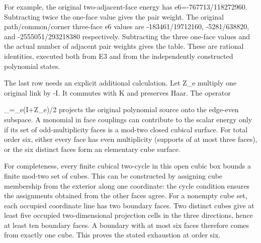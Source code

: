 \documentclass[11pt,a4paper]{article}
\newcounter{none}
\renewcommand{\[}{\begingroup\small\originaldisplaystart}
\renewcommand{\]}{\originaldisplayend\endgroup}
\begin{document}
For example, the original two-adjacent-face energy has
{\ttfamily e\allowbreak{}6\allowbreak{}=\allowbreak{}-\allowbreak{}7\allowbreak{}6\allowbreak{}7\allowbreak{}7\allowbreak{}1\allowbreak{}3\allowbreak{}/\allowbreak{}1\allowbreak{}1\allowbreak{}8\allowbreak{}2\allowbreak{}7\allowbreak{}2\allowbreak{}9\allowbreak{}6\allowbreak{}0\allowbreak{}}.
Subtracting twice the one-face value gives the pair weight. The original
path/common/corner three-face e6 values are
{\ttfamily -\allowbreak{}1\allowbreak{}8\allowbreak{}3\allowbreak{}4\allowbreak{}6\allowbreak{}1\allowbreak{}/\allowbreak{}1\allowbreak{}9\allowbreak{}7\allowbreak{}1\allowbreak{}2\allowbreak{}1\allowbreak{}6\allowbreak{}0\allowbreak{}},
{\ttfamily -\allowbreak{}5\allowbreak{}2\allowbreak{}8\allowbreak{}1\allowbreak{}/\allowbreak{}6\allowbreak{}3\allowbreak{}8\allowbreak{}8\allowbreak{}2\allowbreak{}0\allowbreak{}},
and
{\ttfamily -\allowbreak{}2\allowbreak{}5\allowbreak{}5\allowbreak{}5\allowbreak{}0\allowbreak{}5\allowbreak{}1\allowbreak{}/\allowbreak{}2\allowbreak{}9\allowbreak{}3\allowbreak{}2\allowbreak{}1\allowbreak{}8\allowbreak{}3\allowbreak{}8\allowbreak{}0\allowbreak{}}
respectively. Subtracting the three one-face values and the actual
number of adjacent pair weights gives the table. These are rational
identities, executed both from E3 and from the independently constructed
polynomial states.

The last row needs an explicit additional calculation. Let Z\_e multiply
one original link by -I. It commutes with K and preserves Haar. The
operator

\[
 \Pi_{}=\prod_e(I+Z_e)/2
\] projects the original polynomial source onto the edge-even subspace.
A monomial in face couplings can contribute to the scalar energy only if
its set of odd-multiplicity faces is a mod-two closed cubical surface.
For total order six, either every face has even multiplicity (supports
of at most three faces), or the six distinct faces form an elementary
cube surface.

For completeness, every finite cubical two-cycle in this open cubic box
bounds a finite mod-two set of cubes. This can be constructed by
assigning cube membership from the exterior along one coordinate: the
cycle condition ensures the assignments obtained from the other faces
agree. For a nonempty cube set, each occupied coordinate line has two
boundary faces. Two distinct cubes give at least five occupied
two-dimensional projection cells in the three directions, hence at least
ten boundary faces. A boundary with at most six faces therefore comes
from exactly one cube. This proves the stated exhaustion at order six.
\end{document}
